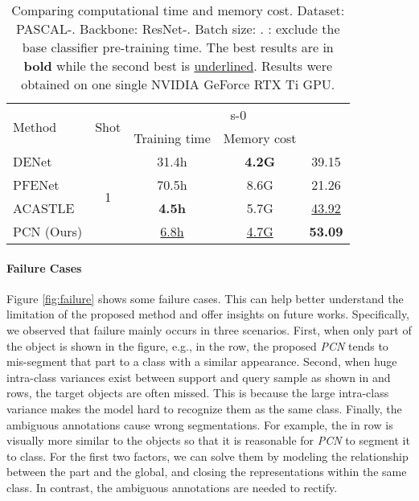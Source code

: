 \documentclass[journal]{IEEEtran}
\begin{document}
\begin{table}[ht]
    \centering
    \caption{Comparing computational time and memory cost. Dataset: PASCAL-. Backbone: ResNet-. Batch size: . : exclude the base classifier pre-training time. The best results are in \textbf{bold} while the second best is \underline{underlined}. Results were obtained on one single NVIDIA GeForce RTX  Ti GPU.}
\label{tab:compute}
\begin{tabular}{l|c|ccc}
    \hline
         \multirow{2}{*}{Method} & \multirow{2}{*}{Shot} & \multicolumn{3}{c}{s-0} \\
         \cline{3-5}
         & & Training time  & Memory cost  &   \\
         \hline
         DENet & \multirow{4}{*}{1} & 31.4h & \textbf{4.2G} & 39.15 \\
         PFENet & & 70.5h & 8.6G & 21.26 \\
         ACASTLE & & \textbf{4.5h} & 5.7G & \underline{43.92} \\
         PCN (Ours) & & \underline{6.8h} & \underline{4.7G} & \textbf{53.09}  \\
    \hline
    \end{tabular}
\end{table}

\paragraph{Failure Cases}
Figure \ref{fig:failure} shows some failure cases. This can help better understand the limitation of the proposed method and offer insights on future works. Specifically, we observed that failure mainly occurs in three scenarios. First, when only part of the object is shown in the figure, e.g.,  in the  row, the proposed \textit{PCN} tends to mis-segment that part to a class with a similar appearance. Second, when huge intra-class variances exist between support and query sample as shown in  and  rows, the target objects are often missed. This is because the large intra-class variance makes the model hard to recognize them as the same class. Finally, the ambiguous annotations cause wrong segmentations. For example, the  in  row is visually more similar to the  objects so that it is reasonable for \textit{PCN} to segment it to  class. For the first two factors, we can solve them by modeling the relationship between the part and the global, and closing the representations within the same class. In contrast, the ambiguous annotations are needed to rectify.
\end{document}
